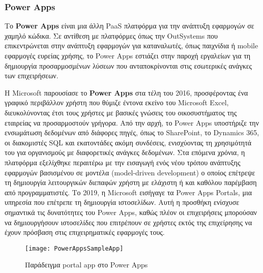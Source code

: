             \subsubsection{Power Apps}
                Το \textbf{Power Apps} είναι μια άλλη PaaS πλατφόρμα για την ανάπτυξη εφαρμογών σε χαμηλό κώδικα. Σε αντίθεση με πλατφόρμες όπως την OutSystems που επικεντρώνεται στην ανάπτυξη εφαρμογών για καταναλωτές, όπως παιχνίδια ή mobile εφαρμογές ευρείας χρήσης, το Power Apps εστιάζει στην παροχή εργαλείων για τη δημιουργία προσαρμοσμένων λύσεων που ανταποκρίνονται στις εσωτερικές ανάγκες των επιχειρήσεων.

                Η Microsoft παρουσίασε το \textbf{Power Apps} στα τέλη του 2016, προσφέροντας ένα γραφικό περιβάλλον χρήστη που θύμιζε έντονα εκείνο του Microsoft Excel, διευκολύνοντας έτσι τους χρήστες με βασικές γνώσεις του οικοσυστήματος της εταιρείας να προσαρμοστούν γρήγορα. Από την αρχή, το Power Apps υποστήριζε την ενσωμάτωση δεδομένων από διάφορες πηγές, όπως το SharePoint, το Dynamics 365, οι διακομιστές SQL και εκατοντάδες ακόμη συνδέσεις, ενισχύοντας τη χρησιμότητά του για οργανισμούς με διαφορετικές ανάγκες δεδομένων. Στα επόμενα χρόνια, η πλατφόρμα εξελίχθηκε περαιτέρω με την εισαγωγή ενός νέου τρόπου ανάπτυξης εφαρμογών βασισμένου σε μοντέλα (model-driven development) ο οποίος επέτρεψε τη δημιουργία λειτουργικών διεπαφών χρήστη με ελάχιστη ή και καθόλου παρέμβαση από προγραμματιστές. Το 2019, η Microsoft εισήγαγε τα Power Apps Portals, μια υπηρεσία που επέτρεπε τη δημιουργία ιστοσελίδων. Αυτή η προσθήκη ενίσχυσε σημαντικά τις δυνατότητες του Power Apps, καθώς πλέον οι επιχειρήσεις μπορούσαν να δημιουργήσουν ιστοσελίδες που επιτρέπουν σε χρήστες εκτός της επιχείρησης να έχουν πρόσβαση στις επιχειρηματικές εφαρμογές τους. \cite{PowerAppsLeung}

                \begin{figure}[h!] \noindent \centering
                        \texttt{[image: PowerAppsSampleApp]}
                        \caption{\centering Παράδειγμα portal app στο Power Apps}
                \end{figure}